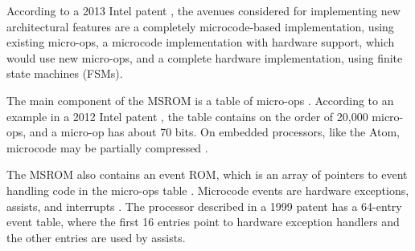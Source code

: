
According to a 2013 Intel patent \cite{intel2013scattergather}, the avenues
considered for implementing new architectural features are a completely
microcode-based implementation, using existing micro-ops, a microcode
implementation with hardware support, which would use new micro-ops, and a
complete hardware implementation, using finite state machines (FSMs).


The main component of the MSROM is a table of micro-ops \cite{intel2008genetic,
intel2012clusters}. According to an example in a 2012 Intel patent
\cite{intel2012clusters}, the table contains on the order of 20,000 micro-ops,
and a micro-op has about 70 bits. On embedded processors, like the Atom,
microcode may be partially compressed
\cite{intel2008genetic, intel2012clusters}.


The MSROM also contains an event ROM, which is an array of pointers to event
handling code in the micro-ops table \cite{intel1999events}. Microcode events
are hardware exceptions, assists, and interrupts \cite{intel1997events,
intel1999exceptions, intel2007microstack}. The processor described in a 1999
patent \cite{intel1999events} has a 64-entry event table, where the first 16
entries point to hardware exception handlers and the other entries are used by
assists.


